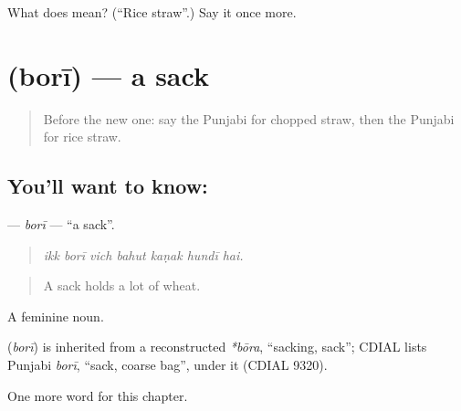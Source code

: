 \begin{tcolorbox}[breakable,colback=teal!4,colframe=teal!35!black,title={Before you move on}]
What does  mean? (\textquotedblleft{}Rice straw\textquotedblright{}.) Say it once more.
\end{tcolorbox}
\section[\texorpdfstring{\pa{ਬੋਰੀ} (borī)}{ਬੋਰੀ (borī)}]{ (borī) — a sack}

\label{lesson:PA-C306-bori}



\begin{quote}
Before the new one: say the Punjabi for chopped straw, then the Punjabi for rice straw.
\end{quote}

\subsection*{You'll want to know: }
\textbf{} — \emph{borī} — \textquotedblleft{}a sack\textquotedblright{}.

\begin{quote}
      
\end{quote}

\begin{quote}
\emph{ikk borī vich bahut kaṇak hundī hai.}
\end{quote}

\begin{quote}
A sack holds a lot of wheat.
\end{quote}

A feminine noun.

\begin{cousinweb}
\textbf{} (\emph{borī}) is inherited from a reconstructed \emph{*bōra}, \textquotedblleft{}sacking, sack\textquotedblright{}; CDIAL lists Punjabi \emph{borī}, \textquotedblleft{}sack, coarse bag\textquotedblright{}, under it (CDIAL 9320).
\end{cousinweb}

\begin{grammarlens}[title={What you've built}]
One more word for this chapter.
\end{grammarlens}


